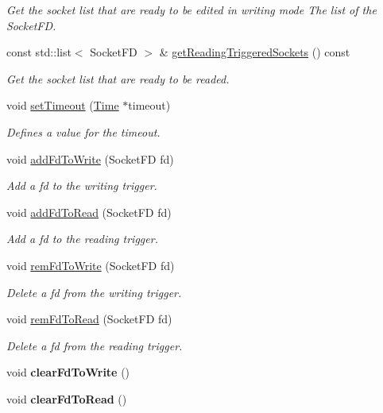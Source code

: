 \begin{DoxyCompactItemize}
\begin{DoxyCompactList}\small\item\em Get the socket list that are ready to be edited in writing mode  The list of the Socket\-F\-D. \end{DoxyCompactList}\item 
const std\-::list$<$ Socket\-F\-D $>$ \& \hyperlink{classmognetwork_1_1_selector_ae41a4ff4e9281cdd03880f69c0c71a35}{get\-Reading\-Triggered\-Sockets} () const 
\begin{DoxyCompactList}\small\item\em Get the socket list that are ready to be readed. \end{DoxyCompactList}\item 
void \hyperlink{classmognetwork_1_1_selector_ac03b53749206d8ba80dec22bad55e0a8}{set\-Timeout} (\hyperlink{_selector_8hh_af47ac292ef7224cf549b944d138ba4ae}{Time} $\ast$timeout)
\begin{DoxyCompactList}\small\item\em Defines a value for the timeout. \end{DoxyCompactList}\item 
void \hyperlink{classmognetwork_1_1_selector_a6f22d28dc38b5d252c0590de857d67f7}{add\-Fd\-To\-Write} (Socket\-F\-D fd)
\begin{DoxyCompactList}\small\item\em Add a fd to the writing trigger. \end{DoxyCompactList}\item 
void \hyperlink{classmognetwork_1_1_selector_aacc48e5256e3b5150f80acad84b82de3}{add\-Fd\-To\-Read} (Socket\-F\-D fd)
\begin{DoxyCompactList}\small\item\em Add a fd to the reading trigger. \end{DoxyCompactList}\item 
void \hyperlink{classmognetwork_1_1_selector_ad03d2d3e016838b38fb865a7924915e5}{rem\-Fd\-To\-Write} (Socket\-F\-D fd)
\begin{DoxyCompactList}\small\item\em Delete a fd from the writing trigger. \end{DoxyCompactList}\item 
void \hyperlink{classmognetwork_1_1_selector_a1ae5d9e72ca6950f82d76e439ce9f74d}{rem\-Fd\-To\-Read} (Socket\-F\-D fd)
\begin{DoxyCompactList}\small\item\em Delete a fd from the reading trigger. \end{DoxyCompactList}\item 
\hypertarget{classmognetwork_1_1_selector_a20320a6ffd2d9c920093f192e1cf444a}{void {\bfseries clear\-Fd\-To\-Write} ()}\label{classmognetwork_1_1_selector_a20320a6ffd2d9c920093f192e1cf444a}

\item 
\hypertarget{classmognetwork_1_1_selector_a88e19f9d3cd6c52ff2461fdd92371940}{void {\bfseries clear\-Fd\-To\-Read} ()}\label{classmognetwork_1_1_selector_a88e19f9d3cd6c52ff2461fdd92371940}

\end{DoxyCompactItemize}


